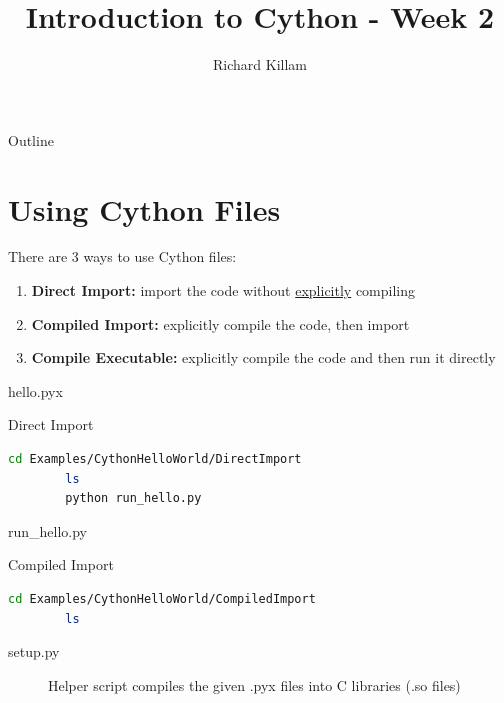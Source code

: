 \documentclass[11pt]{beamer}
\author{Richard Killam}
\title{Introduction to Cython - Week 2}
\begin{document}
\centering

\begin{frame}
	\titlepage
\end{frame}

\begin{frame}{Outline}
	\begin{multicols}{2}
		\tableofcontents
	\end{multicols}
\end{frame}

\section{Using Cython Files}
\begin{frame}[fragile]{}
	There are 3 ways to use Cython files:
	\begin{enumerate}
		\item \textbf{Direct Import:} import the code without \underline{explicitly} compiling
		\item \textbf{Compiled Import:} explicitly compile the code, then import
		\item \textbf{Compile Executable:} explicitly compile the code and then run it directly
	\end{enumerate}
	\pause
	hello.pyx
	
\end{frame}

\begin{frame}[fragile]{Direct Import}
	\begin{lstlisting}[language=Bash]
		cd Examples/CythonHelloWorld/DirectImport
		ls
		python run_hello.py
	\end{lstlisting}
	
	run\_hello.py
	
\end{frame}

\begin{frame}[fragile]{Compiled Import}
	\begin{lstlisting}[language=Bash]
		cd Examples/CythonHelloWorld/CompiledImport
		ls
	\end{lstlisting}
	
	\begin{description}
		\item[setup.py] Helper script compiles the given .pyx files into C libraries (.so files)
		
	\end{description}
\end{frame}
\end{document}
